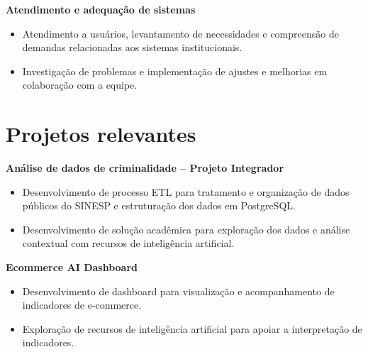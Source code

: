 \documentclass[10pt,a4paper]{article}
\begin{document}
\vspace{1pt}
\textbf{Atendimento e adequação de sistemas}
\begin{itemize}
\item Atendimento a usuários, levantamento de necessidades e compreensão de demandas relacionadas aos sistemas institucionais.
\item Investigação de problemas e implementação de ajustes e melhorias em colaboração com a equipe.
\end{itemize}
\section*{Projetos relevantes}
\textbf{Análise de dados de criminalidade -- Projeto Integrador}
\begin{itemize}
\item Desenvolvimento de processo ETL para tratamento e organização de dados públicos do SINESP e estruturação dos dados em PostgreSQL.
\item Desenvolvimento de solução acadêmica para exploração dos dados e análise contextual com recursos de inteligência artificial.
\end{itemize}
\textbf{Ecommerce AI Dashboard}
\begin{itemize}
\item Desenvolvimento de dashboard para visualização e acompanhamento de indicadores de e-commerce.
\item Exploração de recursos de inteligência artificial para apoiar a interpretação de indicadores.
\end{itemize}
\end{document}
